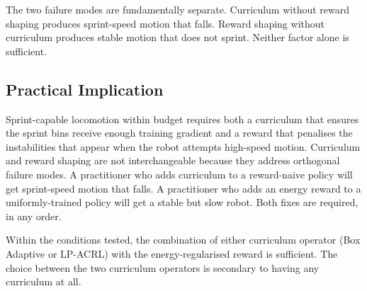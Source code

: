 \documentclass[a4paper,11pt]{article}
\begin{document}
    The two failure modes are fundamentally separate. Curriculum without reward shaping produces sprint-speed motion that falls. Reward shaping without curriculum produces stable motion that does not sprint. Neither factor alone is sufficient.

    \subsection{Practical Implication}

    Sprint-capable locomotion within budget requires both a curriculum that ensures the sprint bins receive enough training gradient and a reward that penalises the instabilities that appear when the robot attempts high-speed motion. Curriculum and reward shaping are not interchangeable because they address orthogonal failure modes. A practitioner who adds curriculum to a reward-naive policy will get sprint-speed motion that falls. A practitioner who adds an energy reward to a uniformly-trained policy will get a stable but slow robot. Both fixes are required, in any order.

    Within the conditions tested, the combination of either curriculum operator (Box Adaptive or LP-ACRL) with the energy-regularised reward is sufficient. The choice between the two curriculum operators is secondary to having any curriculum at all.
\end{document}
